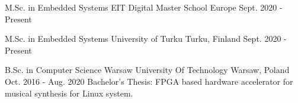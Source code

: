 

\begin{cventries}

  \cventry
    {M.Sc. in Embedded Systems} %
    {EIT Digital Master School} %
    {Europe} %
    {Sept. 2020 - Present} %
    {}

  \cventry
    {M.Sc. in Embedded Systems} %
    {University of Turku} %
    {Turku, Finland} %
    {Sept. 2020 - Present} %
    {}

  \cventry
    {B.Sc. in Computer Science} %
    {Warsaw University Of Technology} %
    {Warsaw, Poland} %
    {Oct. 2016 - Aug. 2020} %
    {Bachelor's Thesis: FPGA based hardware accelerator for musical synthesis for Linux system.}

\end{cventries}

